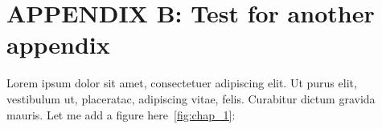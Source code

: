 \renewcommand{\hbAppendixPrefix}{B}
\renewcommand{\thefigure}{\hbAppendixPrefix.\arabic{figure}}
\setcounter{figure}{0}
\renewcommand{\thetable}{\hbAppendixPrefix.\arabic{table}} 
\setcounter{table}{0}

\section{APPENDIX \hbAppendixPrefix: Test for another appendix}

Lorem ipsum dolor sit amet, consectetuer adipiscing elit.  Ut purus elit, vestibulum ut, placeratac,  adipiscing vitae,  felis.   Curabitur dictum gravida mauris.
Let me add a figure here~\cref{fig:chap_1}:

\begin{center}
\end{center}

